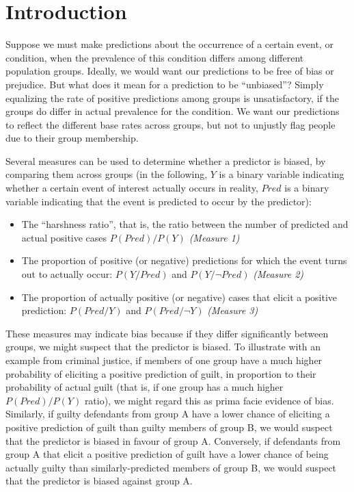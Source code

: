 \documentclass[twocolumn]{article}
\begin{document}
\section{Introduction}

Suppose we must make predictions about the occurrence of a certain event, or
condition, when the prevalence of this condition differs among different
population groups. Ideally, we would want our predictions to be free of bias or
prejudice. But what does it mean for a prediction to be ``unbiased''? Simply
equalizing the rate of positive predictions among groups is unsatisfactory, if
the groups do differ in actual prevalence for the condition. We want our
predictions to reflect the different base rates across groups, but not to
unjustly flag people due to their group membership.


Several measures can be used to determine whether a predictor is biased, by
comparing them across groups (in the following, $Y$ is a binary variable indicating whether a certain event of interest actually occurs in reality,  $Pred$ is a binary variable indicating that the event is predicted to occur by the predictor):

\begin{itemize}

\item The ``harshness ratio'', that is, the ratio between the number of predicted and
actual positive cases $P(Pred)/P(Y)$ \emph{(Measure 1)}

\item The proportion of positive (or negative) predictions  for which the event
turns out to actually occur: $P(Y / Pred)$ and $P(Y / \neg Pred)$ \emph{(Measure 2)}

\item The proportion of actually positive (or negative) cases that elicit a
positive prediction: $P(Pred / Y)$ and $P(Pred / \neg Y)$ \emph{(Measure 3)}

\end{itemize}

These measures may indicate bias because if they differ significantly between
groups, we might suspect that the predictor is biased. To illustrate with an
example from criminal justice, if members of one group have a much higher
probability of eliciting a positive prediction of guilt, in proportion to
their probability of actual guilt (that is, if one group has a much higher
$P(Pred) / P(Y)$ ratio), we might regard this as prima facie evidence of bias.
Similarly, if guilty defendants from group A have a lower chance of eliciting
a positive prediction of guilt than guilty members of group B, we would
suspect that the predictor is biased in favour of group A. Conversely, if
defendants from group A that elicit a positive prediction of guilt have a
lower chance of being actually guilty than similarly-predicted members of
group B, we would suspect that the predictor is biased against group A.
\end{document}
